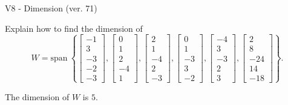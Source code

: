 \begin{exercise}
  \begin{exerciseTitle}V8 - Dimension (ver. 71)\end{exerciseTitle}
  \begin{exerciseStatement}
    Explain how to find the dimension of 
\[W=\mathrm{span}\ \left\{\left[\begin{array}{r}
-1 \\
3 \\
-3 \\
-2 \\
-3
\end{array}\right] , \left[\begin{array}{r}
0 \\
1 \\
2 \\
-4 \\
1
\end{array}\right] , \left[\begin{array}{r}
2 \\
1 \\
-4 \\
2 \\
-3
\end{array}\right] , \left[\begin{array}{r}
0 \\
1 \\
-3 \\
3 \\
-2
\end{array}\right] , \left[\begin{array}{r}
-4 \\
3 \\
-3 \\
2 \\
3
\end{array}\right] , \left[\begin{array}{r}
2 \\
8 \\
-24 \\
14 \\
-18
\end{array}\right]\right\}.\]



  \end{exerciseStatement}
  \begin{exerciseAnswer}
   The dimension of \(W\) is  \(5\).
  


  \end{exerciseAnswer}
\end{exercise}